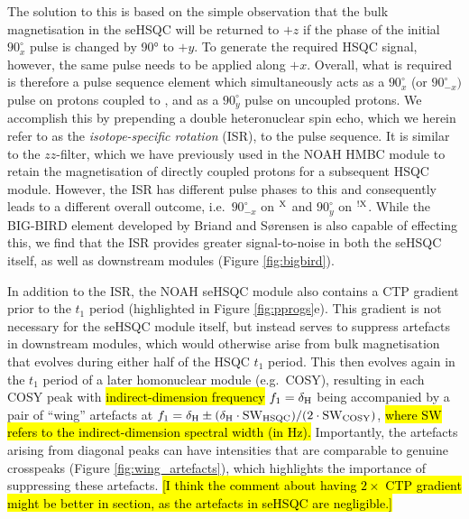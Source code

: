 \documentclass[11pt]{article}
\newcommand*{\carbon}{\ce{^{13}C}}
\newcommand*{\proton}{\ce{^{1}H}}
\newcommand*{\nitrogen}{\ce{^{15}N}}
\newcommand*{\magn}[1]{\ce{^1H}$^{#1}$}
\newcommand*{\magnnot}[1]{\ce{^1H}$^{!#1}$}
\newcommand*{\figref}[1]{Figure \ref{fig:#1}}
\begin{document}
The solution to this is based on the simple observation that the bulk magnetisation in the seHSQC will be returned to $+z$ if the phase of the initial \proton{} $90^\circ_{x}$ pulse is changed by \ang{90} to $+y$.
To generate the required HSQC signal, however, the same pulse needs to be applied along $+x$.
Overall, what is required is therefore a pulse sequence element which simultaneously acts as a $90^\circ_x$ (or $90^\circ_{-x})$ pulse on protons coupled to \carbon{}, and as a $90^\circ_y$ pulse on uncoupled protons.
We accomplish this by prepending a double heteronuclear spin echo, which we herein refer to as the \textit{isotope-specific rotation} (ISR), to the pulse sequence.
It is similar to the $zz$-filter, which we have previously used in the NOAH HMBC module to retain the magnetisation of directly coupled protons for a subsequent HSQC module.\autocite{Kupce2018CC, Kupce2019JMR}
However, the ISR has different pulse phases to this and consequently leads to a different overall outcome, i.e.\ $90^\circ_{-x}$ on \magn{\ce{X}} and $90^\circ_y$ on \magnnot{\ce{X}}.
While the BIG-BIRD element developed by Briand and S{\o}rensen\autocite{Briand1997JMR} is also capable of effecting this, we find that the ISR provides greater signal-to-noise in both the seHSQC itself, as well as downstream modules (\figref{bigbird}).

In addition to the ISR, the NOAH seHSQC module also contains a CTP gradient prior to the $t_1$ period (highlighted in \figref{pprogs}e).
This gradient is not necessary for the seHSQC module itself, but instead serves to suppress artefacts in downstream modules, which would otherwise arise from bulk magnetisation that evolves during either half of the HSQC $t_1$ period.
This then evolves again in the $t_1$ period of a later homonuclear module (e.g.\ COSY), resulting in each COSY peak with \hl{indirect-dimension frequency} $f_1 = \delta_{\ce{H}}$ being accompanied by a pair of ``wing'' artefacts at $f_1 = \delta_{\ce{H}} \pm (\delta_{\ce{H}}\cdot\mathrm{SW_{HSQC}})/(2\cdot \mathrm{SW_{COSY}})$, \hl{where SW refers to the indirect-dimension spectral width (in Hz).}
Importantly, the artefacts arising from diagonal peaks can have intensities that are comparable to genuine crosspeaks (\figref{wing_artefacts}), which highlights the importance of suppressing these artefacts.
\hl{[I think the comment about having $2\times$ CTP gradient might be better in \nitrogen{} section, as the artefacts in \carbon{} seHSQC are negligible.]}
\end{document}
